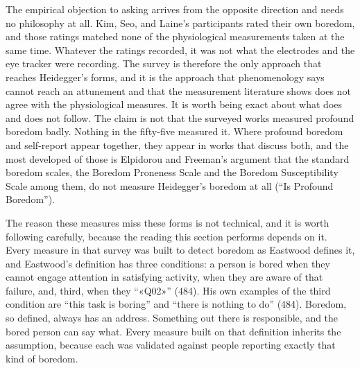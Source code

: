 The empirical objection to asking arrives from the opposite direction and needs no philosophy
at all. Kim, Seo, and Laine's participants rated their own boredom, and those ratings matched
none of the physiological measurements taken at the same time. Whatever the ratings recorded,
it was not what the electrodes and the eye tracker were recording. The survey is therefore the
only approach that reaches Heidegger's forms, and it is the approach that phenomenology says
cannot reach an attunement and that the measurement literature shows does not agree with the
physiological measures. It is worth being exact about what does and does not follow. The claim
is not that the surveyed works measured profound boredom badly. Nothing in the fifty-five
measured it. Where profound boredom and self-report appear together, they appear in works that
discuss both, and the most developed of those is Elpidorou and Freeman's argument that the
standard boredom scales, the Boredom Proneness Scale and the Boredom Susceptibility Scale among
them, do not measure Heidegger's boredom at all (``Is Profound Boredom'').

The reason these measures miss these forms is not technical, and it is worth following
carefully, because the reading this section performs depends on it. Every measure in that
survey was built to detect boredom as Eastwood defines it, and Eastwood's definition has three
conditions: a person is bored when they cannot engage attention in satisfying activity, when
they are aware of that failure, and, third, when they ``«Q02»'' (484). His own examples of the
third condition are ``this task is boring'' and ``there is nothing to do'' (484). Boredom, so
defined, always has an address. Something out there is responsible, and the bored person can
say what. Every measure built on that definition inherits the assumption, because each was
validated against people reporting exactly that kind of boredom.

